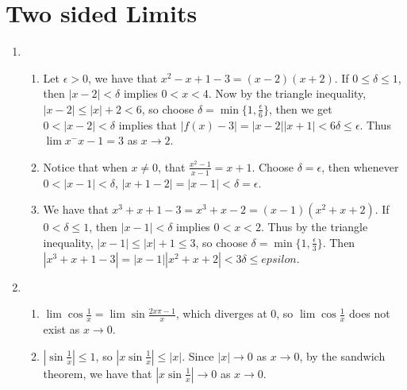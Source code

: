 
\section{Two sided Limits}

\begin{enumerate}[label=(\arabic*)]
    \item
        \begin{enumerate}
        \item Let $\epsilon>0$, we have that  $x^2-x+1-3=(x-2)(x+2)$. If  $0 \leq \delta \leq 1$, then 
            $|x-2|<\delta$ implies  $0<x<4$. Now by the triangle inequality, $|x-2| \leq
            |x|+2<6$, so choose  $\delta=\min\{1,\frac{\epsilon}{6}\}$, then we get $0<|x-2|<\delta$ 
            implies that  $|f(x)-3|=|x-2||x+1|<6\delta \leq \epsilon$. Thus  $\lim{x^-x-1}=3$ 
            as  $x \rightarrow 2$.

        \item Notice that when  $x \neq 0$, that $ \frac{x^2-1}{x-1}=x+1$. Choose $\delta=\epsilon$, 
            then whenever  $0<|x-1|<\delta$,  $|x+1-2|=|x-1|< \delta=\epsilon$.

        \item We have that $x^3+x+1-3=x^3+x-2=(x-1)(x^2+x+2)$. If  $0 < \delta \leq 1$, 
            then  $|x-1| < \delta$ implies $0<x<2$. Thus by the triangle inequality, 
            $|x-1| \leq |x|+1 \leq 3$, so choose $\delta=\min\{1,\frac{\epsilon}{3}\}$. Then 
            $|x^3+x+1-3|=|x-1||x^2+x+2|<3\delta \leq epsilon$.
        \end{enumerate}

    \item
        \begin{enumerate}
        \item $\lim{\cos{\frac{1}{x}}}=\lim{\sin{\frac{2x\pi-1}{x}}}$, which diverges at 
            $0$, so  $\lim{\cos{\frac{1}{x}}}$ does not exist as $x \rightarrow 0$.

        \item $|\sin{\frac{1}{x}}| \leq 1$, so $|x\sin{ \frac{1}{x}}| \leq |x|$. Since 
            $|x| \rightarrow 0$ as  $x \rightarrow 0$, by the sandwich theorem, we have that 
            $|x\sin{\frac{1}{x}}| \rightarrow 0$ as $x \rightarrow 0$.


\end{enumerate}
\end{enumerate}
